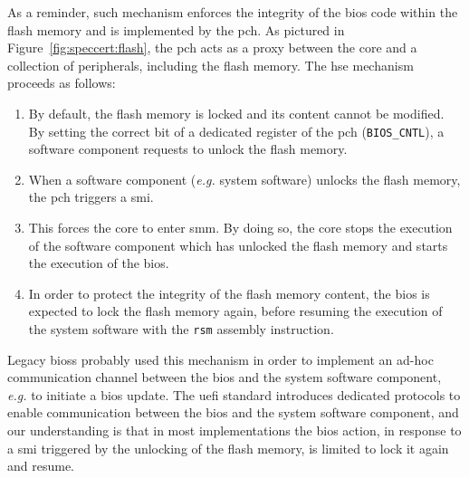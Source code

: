 \begin{example}
  \label{example:speccert:flashdef}

  As a reminder, such mechanism enforces the integrity of the \ac{bios} code
  within the flash memory and is implemented by the \ac{pch}.
  As pictured in Figure~\ref{fig:speccert:flash}, the \ac{pch} acts as a proxy
  between the core and a collection of peripherals, including the flash memory.
  The \ac{hse} mechanism proceeds as follows:
  \begin{enumerate}
  \item By default, the flash memory is locked and its content cannot be
    modified.
    By setting the correct bit of a dedicated register of the \ac{pch}
    (\texttt{BIOS\_CNTL}), a software component requests to unlock the flash
    memory.
  \item When a software component (\emph{e.g.} system software) unlocks the
    flash memory, the \ac{pch} triggers a \ac{smi}.
  \item This forces the core to enter \ac{smm}.
    By doing so, the core stops the execution of the software component which
    has unlocked the flash memory and starts the execution of the \ac{bios}.
  \item In order to protect the integrity of the flash memory content, the
    \ac{bios} is expected to lock the flash memory again, before resuming the
    execution of the system software with the \texttt{rsm} assembly instruction.
  \end{enumerate}

  Legacy \acp{bios} probably used this mechanism in order to implement an ad-hoc
  communication channel between the \ac{bios} and the system software component,
  \emph{e.g.} to initiate a \ac{bios} update.
  The \ac{uefi} standard introduces dedicated protocols to enable communication
  between the \ac{bios} and the system software component, and our understanding
  is that in most implementations the \ac{bios} action, in response to a
  \ac{smi} triggered by the unlocking of the flash memory, is limited to lock it
  again and resume.


\end{example}
